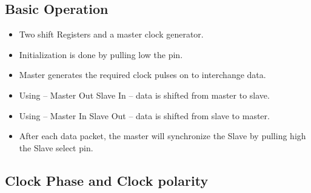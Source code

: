 \documentclass{article}
\begin{document}
\subsection{Basic Operation}
\begin{itemize}
    \item Two shift Registers and a master clock generator.
    \item Initialization is done by pulling low the  pin.
    \item Master generates the required clock pulses on  to interchange data.
    \item Using  – Master Out Slave In – data is shifted from master to slave.
    \item Using  – Master In Slave Out – data is shifted from slave to master.
    \item After each data packet, the master will synchronize the Slave by pulling high the Slave select   pin.
\end{itemize}




\subsection{Clock Phase and Clock polarity}
\end{document}
